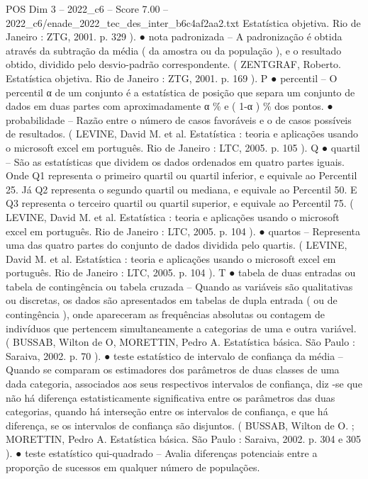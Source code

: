 \begin{textsample}{POS Dim 3 – 2022\_c6 – Score 7.00 – 2022\_c6/enade\_2022\_tec\_des\_inter\_b6c4af2aa2.txt}
Estatística objetiva.
Rio de Janeiro : ZTG, 2001. p. 329 ). {\EmojiFont ●} nota padronizada – A padronização é obtida através da subtração da média ( da amostra ou da população ), e o resultado obtido, dividido pelo desvio-padrão correspondente. ( ZENTGRAF, Roberto.
Estatística objetiva.
Rio de Janeiro : ZTG, 2001. p. 169 ).
P {\EmojiFont ●} percentil – O percentil α de um conjunto é a estatística de posição que separa um conjunto de dados em duas partes com aproximadamente α \% e ( 1-α ) \% dos pontos. {\EmojiFont ●} probabilidade – Razão entre o número de casos favoráveis e o de casos possíveis de resultados. ( LEVINE, David M. et al.
Estatística : teoria e aplicações usando o microsoft excel em português.
Rio de Janeiro : LTC, 2005. p. 105 ).
Q {\EmojiFont ●} quartil – São as estatísticas que dividem os dados ordenados em quatro partes iguais.
Onde Q1 representa o primeiro quartil ou quartil inferior, e equivale ao Percentil 25.
Já Q2 representa o segundo quartil ou mediana, e equivale ao Percentil 50.
E Q3 representa o terceiro quartil ou quartil superior, e equivale ao Percentil 75. ( LEVINE, David M. et al.
Estatística : teoria e aplicações usando o microsoft excel em português.
Rio de Janeiro : LTC, 2005. p. 104 ). {\EmojiFont ●} quartos – Representa uma das quatro partes do conjunto de dados dividida pelo quartis. ( LEVINE, David M. et al.
Estatística : teoria e aplicações usando o microsoft excel em português.
Rio de Janeiro : LTC, 2005. p. 104 ).
T {\EmojiFont ●} tabela de duas entradas ou tabela de contingência ou tabela cruzada – Quando as variáveis são qualitativas ou discretas, os dados são apresentados em tabelas de dupla entrada ( ou de contingência ), onde apareceram as frequências absolutas ou contagem de indivíduos que pertencem simultaneamente a categorias de uma e outra variável. ( BUSSAB, Wilton de O, MORETTIN, Pedro A.
Estatística básica.
São Paulo : Saraiva, 2002. p. 70 ). {\EmojiFont ●} teste estatístico de intervalo de confiança da média – Quando se comparam os estimadores dos parâmetros de duas classes de uma dada categoria, associados aos seus respectivos intervalos de confiança, diz -se que não há diferença estatisticamente significativa entre os parâmetros das duas categorias, quando há interseção entre os intervalos de confiança, e que há diferença, se os intervalos de confiança são disjuntos. ( BUSSAB, Wilton de O. ; MORETTIN, Pedro A.
Estatística básica.
São Paulo : Saraiva, 2002. p. 304 e 305 ). {\EmojiFont ●} teste estatístico qui-quadrado – Avalia diferenças potenciais entre a proporção de sucessos em qualquer número de populações.

\end{textsample}
